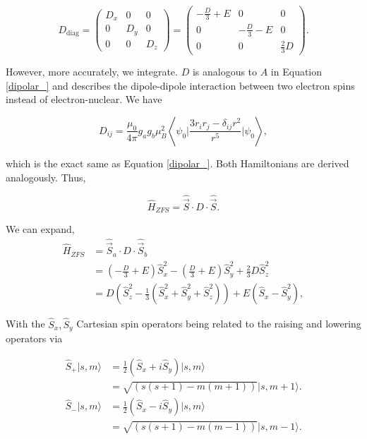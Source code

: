 \documentclass[svgnames]{article}
\begin{document}
\[
D_\text{diag} = \begin{pmatrix}
    D_x & 0 & 0 \\ 
    0 & D_y & 0 \\ 
    0 & 0 & D_z 
\end{pmatrix}  = \begin{pmatrix}
    -\frac{D}{3} + E & 0 & 0 \\ 
    0 & -\frac{D}{3} - E & 0 \\ 
    0 & 0 & \frac{2}{3}D 
\end{pmatrix}.
\] \vspace{3px}


However, more accurately, we integrate. $D$ is analogous to $A$ in Equation
\ref{dipolar_} and describes the dipole-dipole interaction between two electron
spins instead of electron-nuclear. We have 

\[
    D_{ij} = \frac{\mu_0}{4\pi} g_a g_b \mu_B^2 \left\langle \psi_0 \Bigg|
        \frac{3r_ir_j - \delta_{ij}r^2}{r^5} \Bigg| \psi_0\right\rangle,
\] \vspace{3px}

which is the exact same as Equation \ref{dipolar_}. Both Hamiltonians are
derived analogously. Thus,

\vspace{5px}
\begin{purplebox}
    \[ \hat{H}_{ZFS} = \hat{\vec{S}} \cdot D \cdot \hat{\vec{S}}.  
    \]
\end{purplebox}
\vspace{5px} 

We can expand, 
\begin{align}
    \hat{H}_{ZFS} &= \hat{\vec{S}}_a \cdot D \cdot \hat{\vec{S}}_b \\
                  &= \left( -\frac{D}{3}+ E \right)\hat{S}_x^2 - \left(
                  \frac{D}{3} + E \right) \hat{S}_y^2 + \frac{2}{3}D \hat{S}_z^2
                  \\ 
                  &= D\left(\hat{S}_z^2 - \frac{1}{3}\left(\hat{S}_x^2 +
                      \hat{S}_y^2 + \hat{S}_z^2\right) \right) + E(\hat{S}_x -
                      \hat{S}_y^2), 
\end{align}

With the $\hat{S}_x, \hat{S}_y$ Cartesian spin operators being related to the
raising and lowering operators via 

\begin{align} \label{raisinglowering}
    \hat{S}_+ |s, m\rangle &= \frac{1}{2}(\hat{S}_x + i \hat{S}_y )|s, m\rangle \\ 
                           &= \sqrt{(s(s+1) - m(m+1))}|s, m+1\rangle. \\ 
    \hat{S}_- |s, m\rangle &= \frac{1}{2}(\hat{S}_x - i \hat{S}_y )|s, m\rangle \\
                           &= \sqrt{(s(s+1) - m(m-1))}|s, m-1\rangle. 
\end{align}
\end{document}
